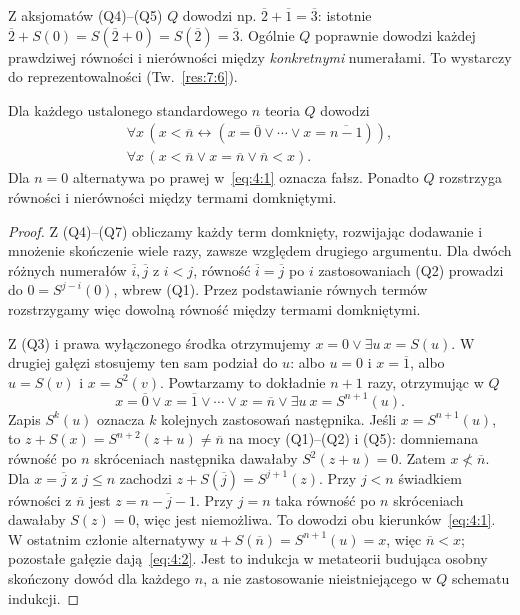 \begin{przyklad}\label{res:4:3}
Z aksjomatów (Q4)--(Q5) $Q$ dowodzi np. $\overline2+\overline1=\overline3$: istotnie $\overline2+S(0)=S(\overline2+0)=S(\overline2)=\overline3$. Ogólnie $Q$ poprawnie dowodzi każdej prawdziwej równości i nierówności między \emph{konkretnymi} numerałami. To wystarczy do reprezentowalności (Tw.~\ref{res:7:6}).
\end{przyklad}

\begin{lemat}\label{res:4:4}
Dla każdego ustalonego standardowego $n$ teoria $Q$ dowodzi
\begin{align}
\forall x\,(x<\overline n\leftrightarrow(x=\overline0\lor\cdots\lor x=\overline{n-1})),\label{eq:4:1}\\
\forall x\,(x<\overline n\lor x=\overline n\lor\overline n<x).\label{eq:4:2}
\end{align}
Dla $n=0$ alternatywa po prawej w~\eqref{eq:4:1} oznacza fałsz. Ponadto $Q$ rozstrzyga równości i nierówności między termami domkniętymi.
\end{lemat}

\begin{proof}
Z (Q4)--(Q7) obliczamy każdy term domknięty, rozwijając dodawanie i mnożenie skończenie wiele razy, zawsze względem drugiego argumentu. Dla dwóch różnych numerałów $\overline i,\overline j$ z $i<j$, równość $\overline i=\overline j$ po $i$ zastosowaniach (Q2) prowadzi do $0=S^{j-i}(0)$, wbrew (Q1). Przez podstawianie równych termów rozstrzygamy więc dowolną równość między termami domkniętymi.

Z (Q3) i prawa wyłączonego środka otrzymujemy $x=0\lor\exists u\ x=S(u)$. W drugiej gałęzi stosujemy ten sam podział do $u$: albo $u=0$ i $x=\overline1$, albo $u=S(v)$ i $x=S^2(v)$. Powtarzamy to dokładnie $n+1$ razy, otrzymując w $Q$
\[
x=\overline0\lor x=\overline1\lor\cdots\lor x=\overline n\lor\exists u\ x=S^{n+1}(u).
\]
Zapis $S^k(u)$ oznacza $k$ kolejnych zastosowań następnika. Jeśli $x=S^{n+1}(u)$, to $z+S(x)=S^{n+2}(z+u)\ne\overline n$ na mocy (Q1)--(Q2) i (Q5): domniemana równość po $n$ skróceniach następnika dawałaby $S^2(z+u)=0$. Zatem $x\not<\overline n$. Dla $x=\overline j$ z $j\le n$ zachodzi $z+S(\overline j)=S^{j+1}(z)$. Przy $j<n$ świadkiem równości z $\overline n$ jest $z=\overline{n-j-1}$. Przy $j=n$ taka równość po $n$ skróceniach dawałaby $S(z)=0$, więc jest niemożliwa. To dowodzi obu kierunków~\eqref{eq:4:1}. W ostatnim członie alternatywy $u+S(\overline n)=S^{n+1}(u)=x$, więc $\overline n<x$; pozostałe gałęzie dają~\eqref{eq:4:2}. Jest to indukcja w metateorii budująca osobny skończony dowód dla każdego $n$, a nie zastosowanie nieistniejącego w $Q$ schematu indukcji.
\end{proof}

